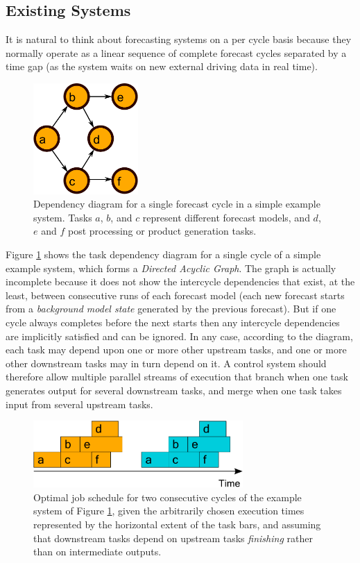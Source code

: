 \documentclass[11pt,a4paper]{article}
\begin{document}
\subsection{Existing Systems}

It is natural to think about forecasting systems on a per cycle basis
because they normally operate as a linear sequence of complete forecast
cycles separated by a time gap (as the system waits on new external
driving data in real time). 
\begin{figure}
    \begin{center}
        \includegraphics[width=4cm]{dependencies-one}
    \end{center}
    \caption{\small Dependency diagram for a single forecast cycle
    in a simple example system. Tasks $a$, $b$, and $c$ represent
    different forecast models, and $d$, $e$ and $f$ post processing or
    product generation tasks.}
    \label{fig-dep-one}
\end{figure}
Figure \ref{fig-dep-one} shows the task dependency diagram for a single
cycle of a simple example system, which forms a {\em Directed
Acyclic Graph}. The graph is actually incomplete because it does not
show the intercycle dependencies that exist, at the least, between
consecutive runs of each forecast model (each new forecast starts from a
{\em background model state} generated by the previous forecast). But
if one cycle always completes before the next starts then any intercycle
dependencies are implicitly satisfied and can be ignored. In any
case, according to the diagram, each task may depend upon one or more
other upstream tasks, and one or more other downstream tasks may in turn
depend on it. A control system should therefore allow multiple parallel
streams of execution that branch when one task generates output for
several downstream tasks, and merge when one task takes input from
several upstream tasks. 
\begin{figure}
    \begin{center}
        \includegraphics[width=8cm]{timeline-one}
    \end{center}
    \caption{\small Optimal job schedule for two consecutive cycles of
    the example system of Figure \ref{fig-dep-one}, given the
    arbitrarily chosen execution times represented by the horizontal
    extent of the task bars, and assuming that downstream tasks depend
    on upstream tasks {\em finishing} rather than on intermediate
    outputs.} 
    \label{fig-time-one}
\end{figure}
\end{document}
